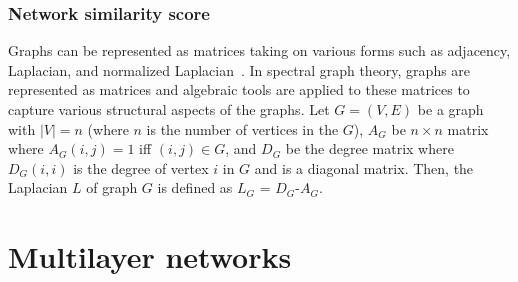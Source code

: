 \documentclass[10pt,letterpaper]{article}
\begin{document}
\subsubsection*{Network similarity score~\cite{gadiyaram2017spectral}}
Graphs can be represented as matrices taking on various forms such as adjacency, Laplacian, and normalized Laplacian~\cite{butler2006spectral, butler2015laplacian, chung1997spectral, luxburg2007spectral, zumstein2005spectral}. In spectral graph theory, graphs are represented as matrices and algebraic tools are applied to these matrices to capture various structural aspects of the graphs. Let $G=(V,E)$ be a graph with $|V|=n$ (where $n$ is the number of vertices in the $G$), $A_G$ be $n \times n$ matrix where $A_G(i,j)=1$ iff $(i,j) \in G$, and $D_G$ be the degree matrix where $D_G(i,i)$ is the degree of vertex $i$ in $G$ and is a diagonal matrix. Then, the Laplacian $L$ of graph $G$ is defined as $L_G$ = $D_G$-$A_G$. 


\section*{Multilayer networks}
\end{document}
